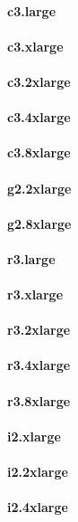 \documentclass{acm_proc_article-sp}
\begin{document}
\paragraph{c3.large}
\paragraph{c3.xlarge}
\paragraph{c3.2xlarge}
\paragraph{c3.4xlarge}
\paragraph{c3.8xlarge}
\paragraph{g2.2xlarge}
\paragraph{g2.8xlarge}
\paragraph{r3.large}
\paragraph{r3.xlarge}
\paragraph{r3.2xlarge}
\paragraph{r3.4xlarge}
\paragraph{r3.8xlarge}
\paragraph{i2.xlarge}
\paragraph{i2.2xlarge}
\paragraph{i2.4xlarge}
\end{document}
